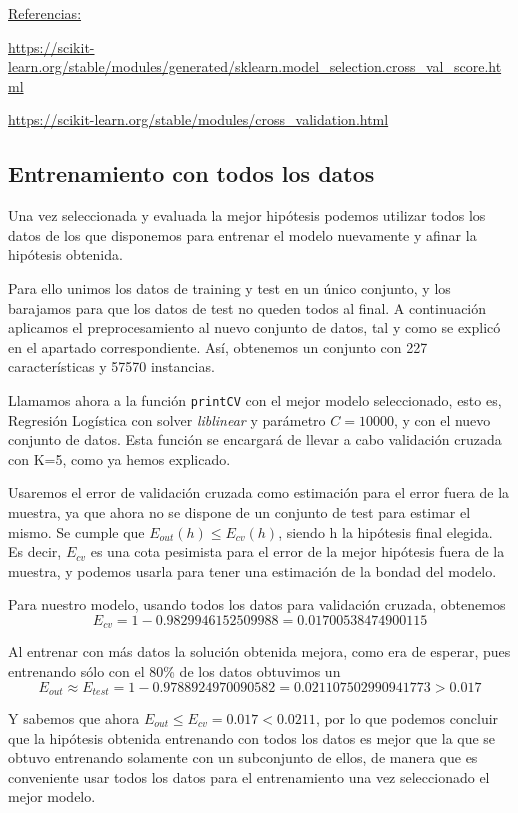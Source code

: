 \documentclass[a4]{article}
\begin{document}
\underline{Referencias:}

\href{https://scikit-learn.org/stable/modules/generated/sklearn.model_selection.cross_val_score.html}{https://scikit-learn.org/stable/modules/generated/sklearn.model\_selection.cross\_val\_score.html}

\href{https://scikit-learn.org/stable/modules/cross_validation.html#cross-validation}{https://scikit-learn.org/stable/modules/cross\_validation.html}

\subsection{Entrenamiento con todos los datos}

Una vez seleccionada y evaluada la mejor hipótesis podemos utilizar todos los datos de los que disponemos para entrenar el modelo nuevamente y afinar la hipótesis obtenida. 

Para ello unimos los datos de training y test en un único conjunto, y los barajamos para que los datos de test no queden todos al final. A continuación aplicamos el preprocesamiento al nuevo conjunto de datos, tal y como se explicó en el apartado correspondiente. Así, obtenemos un conjunto con 227 características y 57570 instancias. 

Llamamos ahora a la función \lstinline|printCV| con el mejor modelo seleccionado, esto es, Regresión Logística con solver \textit{liblinear} y parámetro $ C=10000 $, y con el nuevo conjunto de datos. Esta función se encargará de llevar a cabo validación cruzada con K=5, como ya hemos explicado. 

Usaremos el error de validación cruzada como estimación para el error fuera de la muestra, ya que ahora no se dispone de un conjunto de test para estimar el mismo. Se cumple que $E_{out}(h)\leq E_{cv}(h)$, siendo h la hipótesis final elegida. Es decir, $E_{cv}$ es una cota pesimista para el error de la mejor hipótesis fuera de la muestra, y podemos usarla para tener una estimación de la bondad del modelo. 

Para nuestro modelo, usando todos los datos para validación cruzada, obtenemos $$E_{cv}= 1-0.9829946152509988=0.01700538474900115
$$

Al entrenar con más datos la solución obtenida mejora, como era de esperar, pues entrenando sólo con el 80\% de los datos obtuvimos un $$E_{out}\approx E_{test}=1-0.9788924970090582=0.021107502990941773 > 0.017
$$

Y sabemos que ahora $E_{out}\leq E_{cv}=0.017 < 0.0211$, por lo que podemos concluir que la hipótesis obtenida entrenando con todos los datos es mejor que la que se obtuvo entrenando solamente con un subconjunto de ellos, de manera que es conveniente usar todos los datos para el entrenamiento una vez seleccionado el mejor modelo.  
\end{document}
